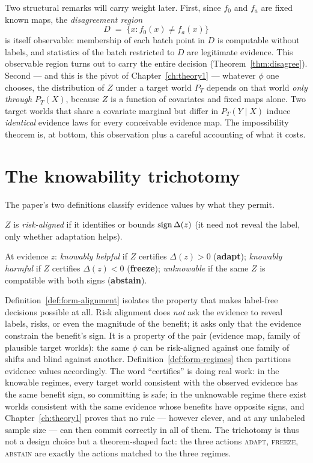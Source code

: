 Two structural remarks will carry weight later. First, since $f_0$ and $f_a$
are fixed known maps, the \emph{disagreement region}
\[
D \;=\; \{x : f_0(x)\neq f_a(x)\}
\]
is itself observable: membership of each batch point in $D$ is computable
without labels, and statistics of the batch restricted to $D$ are legitimate
evidence. This observable region turns out to carry the entire decision
(Theorem~\ref{thm:disagree}). Second --- and this is the pivot of
Chapter~\ref{ch:theory1} --- whatever $\phi$ one chooses, the distribution of
$Z$ under a target world $P_T$ depends on that world \emph{only through}
$P_T(X)$, because $Z$ is a function of covariates and fixed maps alone. Two
target worlds that share a covariate marginal but differ in $P_T(Y \mid X)$
induce \emph{identical} evidence laws for every conceivable evidence map.
The impossibility theorem is, at bottom, this observation plus a careful
accounting of what it costs.

\section{The knowability trichotomy}\label{sec:form-trichotomy}

The paper's two definitions classify evidence values by what they permit.

\begin{definition}\label{def:form-alignment}
$Z$ is \emph{risk-aligned} if it identifies or bounds $\operatorname{sign}\Delta(z)$ (it
need not reveal the label, only whether adaptation helps).
\end{definition}

\begin{definition}[Regimes]\label{def:form-regimes}
At evidence $z$: \emph{knowably helpful} if $Z$ certifies $\Delta(z)>0$
(\textbf{adapt}); \emph{knowably harmful} if $Z$ certifies $\Delta(z)<0$
(\textbf{freeze}); \emph{unknowable} if the same $Z$ is compatible with both
signs (\textbf{abstain}).
\end{definition}

Definition~\ref{def:form-alignment} isolates the property that makes
label-free decisions possible at all. Risk alignment does \emph{not} ask the
evidence to reveal labels, risks, or even the magnitude of the benefit; it
asks only that the evidence constrain the benefit's sign. It is a property of
the pair (evidence map, family of plausible target worlds): the same $\phi$
can be risk-aligned against one family of shifts and blind against another.
Definition~\ref{def:form-regimes} then partitions evidence values
accordingly. The word ``certifies'' is doing real work: in the knowable
regimes, every target world consistent with the observed evidence has the
same benefit sign, so committing is safe; in the unknowable regime there
exist worlds consistent with the same evidence whose benefits have opposite
signs, and Chapter~\ref{ch:theory1} proves that no rule --- however clever,
and at any unlabeled sample size --- can then commit correctly in all of
them. The trichotomy is thus not a design choice but a theorem-shaped fact:
the three actions \textsc{adapt}, \textsc{freeze}, \textsc{abstain} are
exactly the actions matched to the three regimes.

